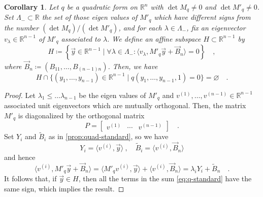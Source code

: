 \documentclass[pdftex,a4paper,12pt]{scrartcl}
\theoremstyle{plain}
\newtheorem{corollary}[theorem]{Corollary}
\theoremstyle{definition}
\theoremstyle{remark}
\numberwithin{equation}{section}
\begin{document}
\begin{corollary}
Let $q$ be a quadratic form on $\mathbb R^n$ with $\det M_q\neq 0$ and $\det M'_q\neq 0$.
Set $\Lambda_-\subset\mathbb R$ the set of those eigen values of $M'_q$ which have different signs from the number $(\det M_q)/(\det M'_q)$, and for each $\lambda\in\Lambda_-$, fix an eigenvector $v_\lambda\in\mathbb R^{n-1}$ of $M'_q$ associated to $\lambda$.
We define an affine subspace $H\subset\mathbb R^{n-1}$ by
\[
H
\coloneqq\left\{
\vec y\in\mathbb R^{n-1}\mid \forall\lambda\in\Lambda_-:\langle v_\lambda,M'_q\vec y+\vec B_n\rangle=0
\right\}
\quad,
\]
where $\vec B_n \coloneqq (B_{11},\dots,B_{(n-1)n})$.
Then, we have
\[
H\cap\{(y_1,\dots,y_{n-1})\in\mathbb R^{n-1}\mid q(y_1,\dots,y_{n-1},1)=0\}
= \varnothing
\quad.
\]
\end{corollary}
\begin{proof}
Let $\lambda_1\le\dots\lambda_{n-1}$ be the eigen values of $M'_q$ and $v^{(1)},\dots,v^{(n-1)}\in\mathbb R^{n-1}$ associated unit eigenvectors which are mutually orthogonal.
Then, the matrix $M'_q$ is diagonalized by the orthogonal matrix
\[
P =
\begin{bmatrix}
v^{(1)} & \cdots & v^{(n-1)}
\end{bmatrix}
\quad.
\]
Set $Y_i$ and $\widetilde B_i$ as in \cref{prop:quad-standard}, so we have
\[
Y_i = \langle v^{(i)},\vec y\rangle
\ ,\quad \widetilde B_i = \langle v^{(i)},\vec B_n\rangle
\]
and hence
\[
\langle v^{(i)},M'_q\vec y + \vec B_n\rangle
= \langle M'_q v^{(i)},\vec y\rangle + \langle v^{(i)},\vec B_n\rangle
= \lambda_i Y_i + \widetilde B_n
\quad.
\]
It follows that, if $\vec y\in H$, then all the terms in the sum \eqref{eq:q-standard} have the same sign, which implies the result.
\end{proof}
\end{document}
